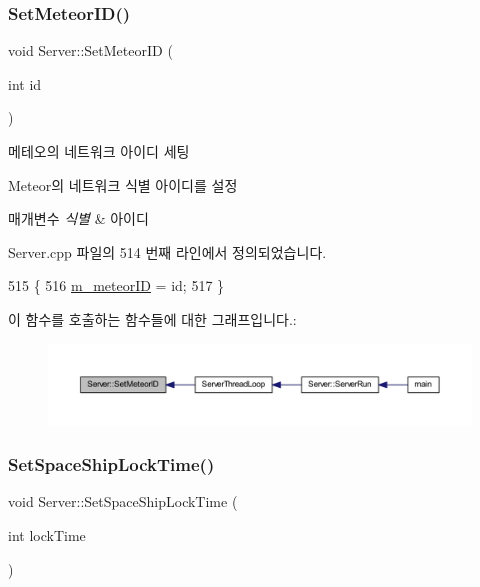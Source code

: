 \subsubsection{\texorpdfstring{Set\+Meteor\+I\+D()}{SetMeteorID()}}
{\footnotesize\ttfamily void Server\+::\+Set\+Meteor\+ID (\begin{DoxyParamCaption}\item[{int}]{id }\end{DoxyParamCaption})}



메테오의 네트워크 아이디 세팅 

Meteor의 네트워크 식별 아이디를 설정


\begin{DoxyParams}{매개변수}
{\em 식별} & 아이디 \\
\hline
\end{DoxyParams}


Server.\+cpp 파일의 514 번째 라인에서 정의되었습니다.


\begin{DoxyCode}
515 \{
516     \hyperlink{class_server_ab4f0de3a4d653f8b8631caf922643414}{m\_meteorID} = id;
517 \}
\end{DoxyCode}
이 함수를 호출하는 함수들에 대한 그래프입니다.\+:\nopagebreak
\begin{figure}[H]
\begin{center}
\leavevmode
\includegraphics[width=350pt]{class_server_a582ad4eb2272b1ab92daad71dc700e8d_icgraph}
\end{center}
\end{figure}
\mbox{\label{class_server_a3866f3d6a99358d0068cee3d5bc529d2}} 
\subsubsection{\texorpdfstring{Set\+Space\+Ship\+Lock\+Time()}{SetSpaceShipLockTime()}}
{\footnotesize\ttfamily void Server\+::\+Set\+Space\+Ship\+Lock\+Time (\begin{DoxyParamCaption}\item[{int}]{lock\+Time }\end{DoxyParamCaption})}



